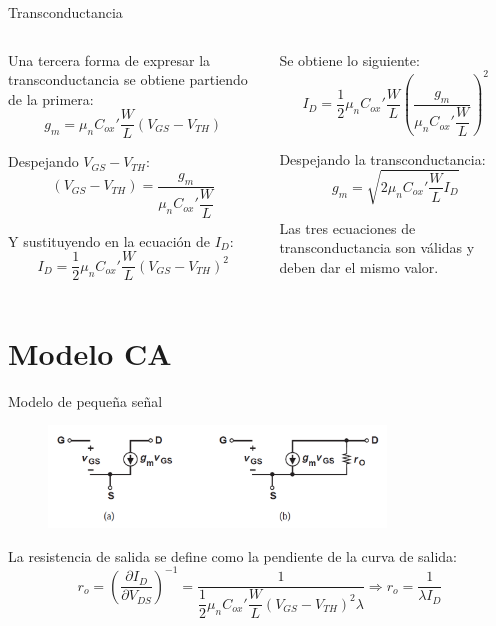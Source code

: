 \documentclass[t,aspectratio=169]{beamer}
\begin{document}
\begin{frame}{Transconductancia}

\begin{columns}

\begin{column}{0.5\textwidth}

Una tercera forma de expresar la transconductancia se obtiene partiendo de la primera:
\[ g_m =  \mu_n C_{ox}' \dfrac{W}{L} (V_{GS} - V_{TH}) \]

Despejando $V_{GS} - V_{TH}$:
\[ (V_{GS} - V_{TH}) = \dfrac{g_m}{\mu_n C_{ox}' \dfrac{W}{L}} \]

Y sustituyendo en la ecuación de $I_D$:
\[ I_D = \dfrac{1}{2} \mu_n C_{ox}' \dfrac{W}{L} (V_{GS} - V_{TH})^2 \]

\end{column}

\begin{column}{0.5\textwidth}

Se obtiene lo siguiente:
\[ I_D = \dfrac{1}{2} \mu_n C_{ox}' \dfrac{W}{L} \left(\dfrac{g_m}{\mu_n C_{ox}' \dfrac{W}{L}}\right)^2 \]

Despejando la transconductancia:
\[ \boxed{g_m = \sqrt{2 \mu_n C_{ox}' \dfrac{W}{L} I_D}} \]

Las tres ecuaciones de transconductancia son válidas y deben dar el mismo valor.

\end{column}

\end{columns}

\end{frame}

\section{Modelo CA}
\begin{frame}{Modelo de pequeña señal}

\begin{figure}[H]
    \centering
    \includegraphics[width=0.8\textwidth]{figuras/modelo_ca_mosfet.png}
\end{figure}

La resistencia de salida se define como la pendiente de la curva de salida:
\[ r_o = \left( \dfrac{\partial I_D}{\partial V_{DS}} \right)^{-1} = \dfrac{1}{\dfrac{1}{2}\mu_n C_{ox}' \dfrac{W}{L} (V_{GS}-V_{TH})^2 \lambda} \Rightarrow \boxed{r_o = \dfrac{1}{\lambda I_D}} \]


\end{frame}
\end{document}

